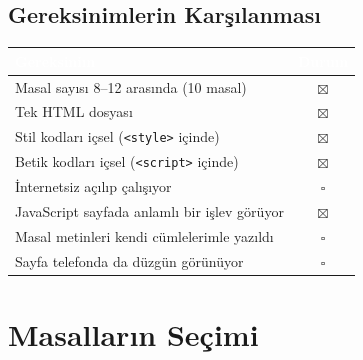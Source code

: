 \documentclass[12pt,a4paper]{article}
\begin{document}
\subsection{Gereksinimlerin Karşılanması}
\begin{center}
\begin{tabular}{@{}p{8.2cm}c@{}}
\toprule
\rowcolor{ana}\textcolor{white}{\textbf{Gereksinim}} & \textcolor{white}{\textbf{Durum}} \\
\midrule
Masal sayısı 8--12 arasında (10 masal)         & $\boxtimes$ \\
Tek HTML dosyası                                    & $\boxtimes$ \\
Stil kodları içsel (\texttt{<style>} içinde)        & $\boxtimes$ \\
Betik kodları içsel (\texttt{<script>} içinde)      & $\boxtimes$ \\
İnternetsiz açılıp çalışıyor                        & $\square$ \\
JavaScript sayfada anlamlı bir işlev görüyor        & $\boxtimes$ \\
Masal metinleri kendi cümlelerimle yazıldı          & $\square$ \\
Sayfa telefonda da düzgün görünüyor                 & $\square$ \\
\bottomrule
\end{tabular}
\end{center}


\section{Masalların Seçimi}
\end{document}
